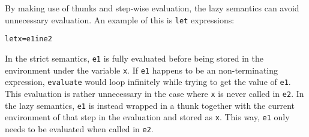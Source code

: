 By making use of thunks and step-wise evaluation, the lazy semantics can avoid unnecessary
evaluation. An example of this is \texttt{let} expressions:
\begin{alltt}
  let x = e1 in e2
\end{alltt}
In the strict semantics, \texttt{e1} is fully evaluated before being stored in the
environment under the variable \texttt{x}. If \texttt{e1} happens to be an non-terminating
expression, \texttt{evaluate} would loop infinitely while trying to get the value of \texttt{e1}.
This evaluation is rather unnecessary in the case where \texttt{x} is never called in
\texttt{e2}. In the lazy semantics, \texttt{e1} is instead wrapped in a thunk together with
the current environment of that step in the evaluation and stored as \texttt{x}. This way,
\texttt{e1} only needs to be evaluated when called in \texttt{e2}.
